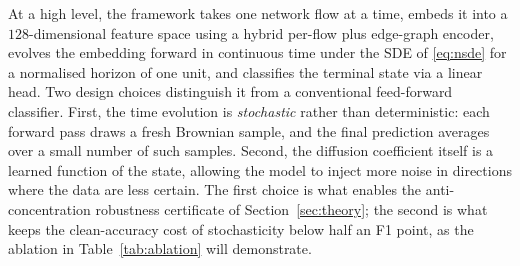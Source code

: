 \documentclass[journal,10pt]{IEEEtran}
\theoremstyle{definition}
\theoremstyle{remark}
\begin{document}
At a high level, the framework takes one network flow at a time,
embeds it into a $128$-dimensional feature space using a hybrid
per-flow plus edge-graph encoder, evolves the embedding forward in
continuous time under the SDE of \eqref{eq:nsde} for a normalised
horizon of one unit, and classifies the terminal state via a linear
head. Two design choices distinguish it from a conventional
feed-forward classifier. First, the time evolution is
\emph{stochastic} rather than deterministic: each forward pass draws
a fresh Brownian sample, and the final prediction averages over a
small number of such samples. Second, the diffusion coefficient
itself is a learned function of the state, allowing the model to
inject more noise in directions where the data are less certain.
The first choice is what enables the anti-concentration robustness
certificate of Section~\ref{sec:theory}; the second is what keeps
the clean-accuracy cost of stochasticity below half an F1 point,
as the ablation in Table~\ref{tab:ablation} will demonstrate.
\end{document}
